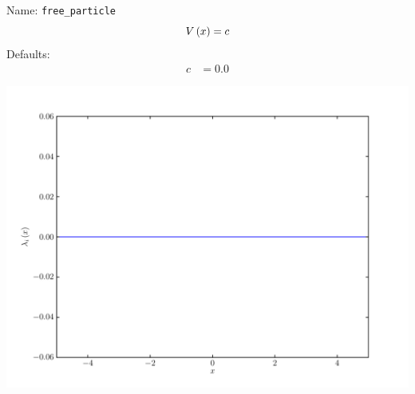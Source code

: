 \documentclass[a4paper,10pt]{report}
\begin{document}
\begin{minipage}{0.5\linewidth}
  Name:    \texttt{free\_particle}
  \begin{equation*}
    V\left( x \right) = c
  \end{equation*}
  Defaults:
  \begin{align*}
    c &= 0.0
  \end{align*}
\end{minipage}
\begin{minipage}{0.5\linewidth}
  \begin{center}
    \includegraphics[scale=0.25]{./fig/free_particle.pdf}
  \end{center}
\end{minipage}
\end{document}
